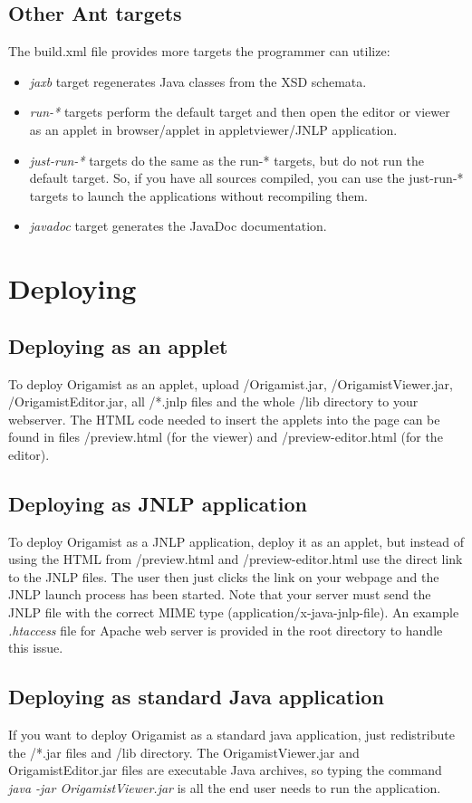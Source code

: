 \subsection{Other Ant targets}
The build.xml file provides more targets the programmer can utilize:
\begin{itemize}
\item \emph{jaxb} target regenerates Java classes from the XSD schemata.
\item \emph{run-*} targets perform the default target and then open the editor or viewer as an applet in browser/applet in appletviewer/JNLP application.
\item \emph{just-run-*} targets do the same as the run-* targets, but do not run the default target. So, if you have all sources compiled, you can use the just-run-* targets to launch the applications without recompiling them.
\item \emph{javadoc} target generates the JavaDoc documentation.
\end{itemize}

\section{Deploying}
\subsection{Deploying as an applet}
To deploy Origamist as an applet, upload /Origamist.jar, /OrigamistViewer.jar, /OrigamistEditor.jar, all /*.jnlp files and the whole /lib directory to your webserver. The HTML code needed to insert the applets into the page can be found in files /preview.html (for the viewer) and /preview-editor.html (for the editor).

\subsection{Deploying as JNLP application}
To deploy Origamist as a JNLP application, deploy it as an applet, but instead of using the HTML from /preview.html and /preview-editor.html use the direct link to the JNLP files. The user then just clicks the link on your webpage and the JNLP launch process has been started. Note that your server must send the JNLP file with the correct MIME type (application/x-java-jnlp-file). An example \emph{.htaccess} file for Apache web server is provided in the root directory to handle this issue.

\subsection{Deploying as standard Java application}
If you want to deploy Origamist as a standard java application, just redistribute the /*.jar files and /lib directory. The OrigamistViewer.jar and OrigamistEditor.jar files are executable Java archives, so typing the command \emph{java -jar OrigamistViewer.jar} is all the end user needs to run the application.

